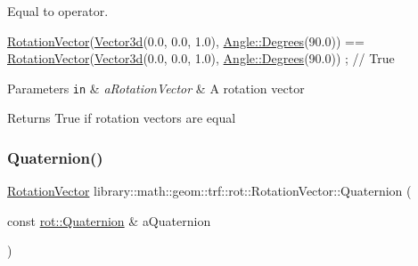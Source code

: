 Equal to operator. 


\begin{DoxyCode}
\hyperlink{classlibrary_1_1math_1_1geom_1_1trf_1_1rot_1_1_rotation_vector_a32b1fab5e81bc24d777324daf5849205}{RotationVector}(\hyperlink{namespacelibrary_1_1math_1_1obj_a977e84e9bf317a4e7dd9d6d671d6da2f}{Vector3d}(0.0, 0.0, 1.0), \hyperlink{classlibrary_1_1math_1_1geom_1_1_angle_a64aa53e8420aeb6f671d86c65c370bc8}{Angle::Degrees}(90.0)) == 
      \hyperlink{classlibrary_1_1math_1_1geom_1_1trf_1_1rot_1_1_rotation_vector_a32b1fab5e81bc24d777324daf5849205}{RotationVector}(\hyperlink{namespacelibrary_1_1math_1_1obj_a977e84e9bf317a4e7dd9d6d671d6da2f}{Vector3d}(0.0, 0.0, 1.0), \hyperlink{classlibrary_1_1math_1_1geom_1_1_angle_a64aa53e8420aeb6f671d86c65c370bc8}{Angle::Degrees}(90.0)) ; \textcolor{comment}{// True}
\end{DoxyCode}



\begin{DoxyParams}[1]{Parameters}
\mbox{\tt in}  & {\em a\+Rotation\+Vector} & A rotation vector \\
\hline
\end{DoxyParams}
\begin{DoxyReturn}{Returns}
True if rotation vectors are equal 
\end{DoxyReturn}
\mbox{\label{classlibrary_1_1math_1_1geom_1_1trf_1_1rot_1_1_rotation_vector_a63ba12aac718671383516a0adab25aec}} 
\subsubsection{\texorpdfstring{Quaternion()}{Quaternion()}}
{\footnotesize\ttfamily \hyperlink{classlibrary_1_1math_1_1geom_1_1trf_1_1rot_1_1_rotation_vector}{Rotation\+Vector} library\+::math\+::geom\+::trf\+::rot\+::\+Rotation\+Vector\+::\+Quaternion (\begin{DoxyParamCaption}\item[{const \hyperlink{classlibrary_1_1math_1_1geom_1_1trf_1_1rot_1_1_quaternion}{rot\+::\+Quaternion} \&}]{a\+Quaternion }\end{DoxyParamCaption})\hspace{0.3cm}{\ttfamily [static]}}



